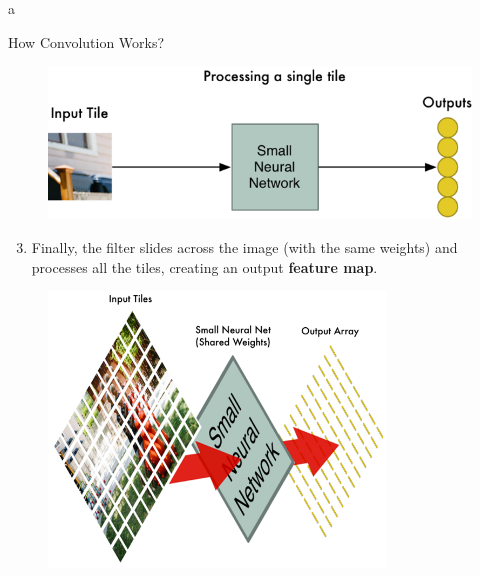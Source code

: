 a\documentclass[10pt]{beamer}
\theoremstyle{remark}
\theoremstyle{definition}
\begin{document}
\begin{frame}[allowframebreaks]{How Convolution Works?}
\begin{figure}
\centering
\includegraphics[width=1.0\textwidth,height=0.9\textheight,keepaspectratio]{./images/conv_4.png}
\end{figure}

\framebreak

\begin{enumerate}
    \setcounter{enumi}{2}
    \item Finally, the filter slides across the image (with the same weights) and processes all the tiles, creating an output \textbf{feature map}.
\end{enumerate}

\begin{figure}
\centering
\includegraphics[width=0.8\textwidth,height=0.8\textheight,keepaspectratio]{./images/conv_5.png}
\end{figure}


\framebreak


\end{frame}
\end{document}
